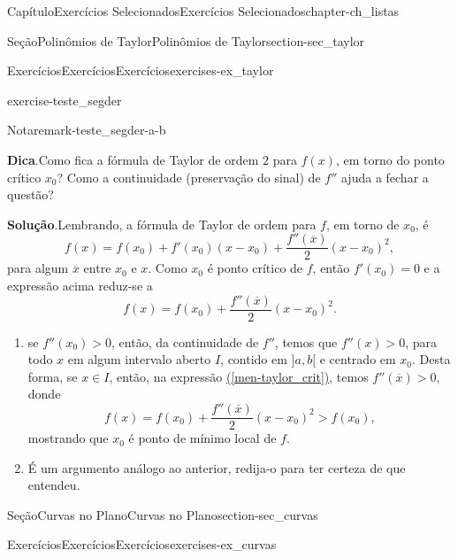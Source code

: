 \documentclass[oneside,10pt,]{book}
\newcommand{\blocktitlefont}{\relax}
\newcommand{\xreffont}{\relax}
\numberwithin{equation}{section}
\begin{document}
\begin{chapterptx}{Capítulo}{Exercícios Selecionados}{}{Exercícios Selecionados}{}{}{chapter-ch_listas}
\begin{sectionptx}{Seção}{Polinômios de Taylor}{}{Polinômios de Taylor}{}{}{section-sec_taylor}
\begin{exercises-subsection-numberless}{Exercícios}{Exercícios}{}{Exercícios}{}{}{exercises-ex_taylor}
\begin{divisionexercise}{7}{}{}{exercise-teste_segder}
\begin{remark}{Nota}{}{remark-teste_segder-a-b}
\end{remark}
\par\smallskip%
\noindent\textbf{\blocktitlefont Dica}.\hypertarget{hint-teste_segder-b}{}\quad{}Como fica a fórmula de Taylor de ordem \(2\) para \(f(x)\), em torno do ponto crítico \(x_0\)? Como a continuidade (preservação do sinal) de \(f''\) ajuda a fechar a questão?%
\par\smallskip%
\noindent\textbf{\blocktitlefont Solução}.\hypertarget{solution-teste_segder-c}{}\quad{}Lembrando, a fórmula de Taylor de ordem para \(f\), em torno de \(x_0\), é%
\begin{equation*}
f(x)=f(x_0)+f'(x_0)(x-x_0)+\dfrac{f''(\overline{x})}{2}(x-x_0)^2,
\end{equation*}
para algum \(\overline{x}\) entre \(x_0\) e \(x\). Como \(x_0\) é ponto crítico de \(f\), então \(f'(x_0)=0\) e a expressão acima reduz-se a%
\begin{equation}
f(x)=f(x_0)+\dfrac{f''(\overline{x})}{2}(x-x_0)^2.\label{men-taylor_crit}
\end{equation}
%
\begin{enumerate}[label=\alph*]
\item{}se \(f'' (x_ 0)>0\), então, da continuidade de \(f''\), temos que \(f'' (x)>0\), para todo \(x\) em algum intervalo aberto \(I\), contido em \(]a,b[\) e centrado em \(x_0\). Desta forma, se \(x\in I\), então, na expressão \hyperref[men-taylor_crit]{({\xreffont\ref{men-taylor_crit}})}, temos \(f''(\overline{x})>0\), donde%
\begin{equation*}
f(x)=f(x_0)+\dfrac{f''(\overline{x})}{2}(x-x_0)^2>f(x_0),
\end{equation*}
mostrando que \(x_0\) é ponto de mínimo local de \(f\).%
\item{}É um argumento análogo ao anterior, redija-o para ter certeza de que entendeu.%
\end{enumerate}
%
\end{divisionexercise}%
\end{exercises-subsection-numberless}
\end{sectionptx}
%
%
\typeout{************************************************}
\typeout{************************************************}
%
\begin{sectionptx}{Seção}{Curvas no Plano}{}{Curvas no Plano}{}{}{section-sec_curvas}
%
%
\typeout{************************************************}
\typeout{************************************************}
%
\begin{exercises-subsection-numberless}{Exercícios}{Exercícios}{}{Exercícios}{}{}{exercises-ex_curvas}

\end{exercises-subsection-numberless}
\end{sectionptx}
\end{chapterptx}
\end{document}
